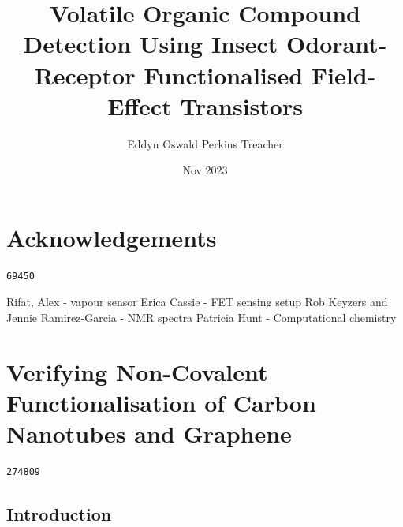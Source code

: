 \documentclass[
  a4paper,
]{scrbook}
\title{Volatile Organic Compound Detection Using Insect Odorant-Receptor
Functionalised Field-Effect Transistors}
\author{Eddyn Oswald Perkins Treacher}
\date{Nov 2023}
\renewcommand*\contentsname{Table of contents}
\newcommand\contentsname{Table of contents}
\begin{document}
\frontmatter
\maketitle
\ifdefined\Shaded\renewenvironment{Shaded}{\begin{tcolorbox}[boxrule=0pt, breakable, interior hidden, borderline west={3pt}{0pt}{shadecolor}, sharp corners, enhanced, frame hidden]}{\end{tcolorbox}}\fi

\renewcommand*\contentsname{Table of contents}
{
\setcounter{tocdepth}{2}
\tableofcontents
}
\mainmatter
{}

\hypertarget{acknowledgements}{%
\chapter*{Acknowledgements}\label{acknowledgements}}


\begin{verbatim}
69450
\end{verbatim}

Rifat, Alex - vapour sensor Erica Cassie - FET sensing setup Rob Keyzers
and Jennie Ramirez-Garcia - NMR spectra Patricia Hunt - Computational
chemistry


\hypertarget{verifying-non-covalent-functionalisation-of-carbon-nanotubes-and-graphene}{%
\chapter{Verifying Non-Covalent Functionalisation of Carbon Nanotubes
and
Graphene}\label{verifying-non-covalent-functionalisation-of-carbon-nanotubes-and-graphene}}

\begin{verbatim}
274809
\end{verbatim}

\hypertarget{introduction}{%
\section{Introduction}\label{introduction}}
\end{document}
